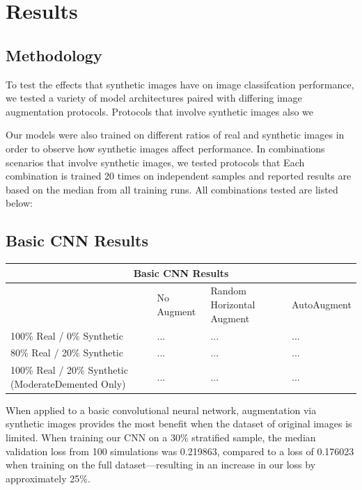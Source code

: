 \documentclass [MS] {uclathes}
\begin{document}
\chapter{Results}

\section{Methodology}
To test the effects that synthetic images have on image classifcation performance, we tested a variety of model 
architectures paired with differing image augmentation protocols. Protocols that involve synthetic images also we 


Our models were also trained on different ratios of real 
and synthetic images in order to observe how synthetic images affect performance. In combinations scenarios that involve 
synthetic images, we tested protocols that   Each combination is trained 20 times 
on independent samples and reported results are based on the median from all training runs. All combinations tested are
listed below:

\section{Basic CNN Results}

\begin{center}
\begin{tabular}{ |p{4cm}||p{4cm}|p{4cm}|p{4cm}|  }
    \hline
    \multicolumn{4}{|c|}{Basic CNN Results} \\
    \hline
     & No Augment & Random Horizontal Augment & AutoAugment\\
    \hline
    100\% Real / 0\% Synthetic  & ... & ... & ...\\
    80\% Real / 20\% Synthetic  & ... & ... & ...\\
    100\% Real / 20\% Synthetic (ModerateDemented Only)  & ... & ... & ...\\
    
    \hline
\end{tabular}
\end{center}

When applied to a basic convolutional neural network, augmentation via synthetic images provides the most benefit when 
the dataset of original images is limited. When training our CNN on a 30\% stratified sample, the median validation loss 
from 100 simulations was 0.219863, compared to a loss of 0.176023 when training on the full dataset---resulting in an 
increase in our loss by approximately 25\%.
\end{document}
